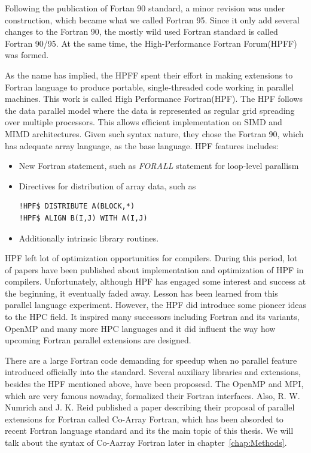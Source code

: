 Following the publication of Fortan 90 standard, a minor revision was under construction, which became what we called Fortran 95. Since it only add several changes to the Fortran 90, the mostly wild used Fortran standard is called Fortran 90/95. At the same time, the High-Performance Fortran Forum(HPFF) was formed. 
 
As the name has implied, the HPFF spent their effort in making extensions to Fortran language to produce portable, single-threaded code working in parallel machines. This work is called High Performance Fortran(HPF).  The HPF follows the data parallel model where the data is represented as regular grid spreading over multiple processors. This allows efficient implementation on SIMD and MIMD architectures. Given such syntax nature, they chose the Fortran 90, which has adequate array language, as the base language. HPF features includes:
\begin{itemize}
\item New Fortran statement, such as \emph{FORALL} statement for loop-level parallism
\item Directives for distribution of array data, such as 
\begin{lstlisting}
!HPF$ DISTRIBUTE A(BLOCK,*)
!HPF$ ALIGN B(I,J) WITH A(I,J)
\end{lstlisting}
\item Additionally intrinsic library routines. 
\end{itemize} 
HPF left lot of optimization opportunities for compilers. During this period, lot of papers have been published about implementation and optimization of HPF in compilers\cite{loveman1993high}\cite{bozkus1994compiling}\cite{gupta1995hpf}. Unfortunately, although HPF has engaged some interest and success at the beginning, it eventually faded away. Lesson has been learned from this parallel language experiment\cite{Kennedy2011}. However, the HPF did introduce some pioneer ideas to the HPC field. It inspired many successors including Fortran and its variants, OpenMP and many more HPC languages and it did influent the way how upcoming Fortran parallel extensions are designed. 

There are a large Fortran code demanding for speedup when no parallel feature introduced officially into the standard. Several auxiliary libraries and extensions, besides the HPF mentioned above, have been proposesd. The OpenMP and MPI, which are very famous nowaday, formalized their Fortran interfaces. Also, R. W. Numrich and J. K. Reid\cite{numrich1998co} published a paper describing their proposal of parallel extensions for Fortran called Co-Array Fortran, which has been absorded to recent Fortran language standard and its the main topic of this thesis. We will talk about the syntax of Co-Aarray Fortran later in chapter~\ref{chap:Methods}. 

